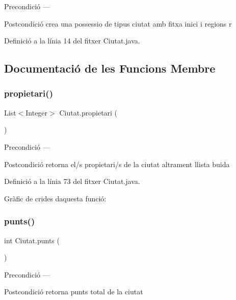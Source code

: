 \begin{DoxyPrecond}{Precondició}
--- 
\end{DoxyPrecond}
\begin{DoxyPostcond}{Postcondició}
crea una possessio de tipus ciutat amb fitxa inici i regions r 
\end{DoxyPostcond}


Definició a la línia 14 del fitxer Ciutat.\+java.



\subsection{Documentació de les Funcions Membre}
\mbox{\label{class_ciutat_afd286f07dc54151be32b79327f8259e9}} 
\subsubsection{\texorpdfstring{propietari()}{propietari()}}
{\footnotesize\ttfamily List$<$Integer$>$ Ciutat.\+propietari (\begin{DoxyParamCaption}{ }\end{DoxyParamCaption})}

\begin{DoxyPrecond}{Precondició}
--- 
\end{DoxyPrecond}
\begin{DoxyPostcond}{Postcondició}
retorna el/s propietari/s de la ciutat altrament llista buida 
\end{DoxyPostcond}


Definició a la línia 73 del fitxer Ciutat.\+java.

Gràfic de crides d\textquotesingle{}aquesta funció\+:
\mbox{\label{class_ciutat_a47eb8c10d3a938b85050a1620c4d05ea}} 
\subsubsection{\texorpdfstring{punts()}{punts()}}
{\footnotesize\ttfamily int Ciutat.\+punts (\begin{DoxyParamCaption}{ }\end{DoxyParamCaption})}

\begin{DoxyPrecond}{Precondició}
--- 
\end{DoxyPrecond}
\begin{DoxyPostcond}{Postcondició}
retorna punts total de la ciutat 
\end{DoxyPostcond}


